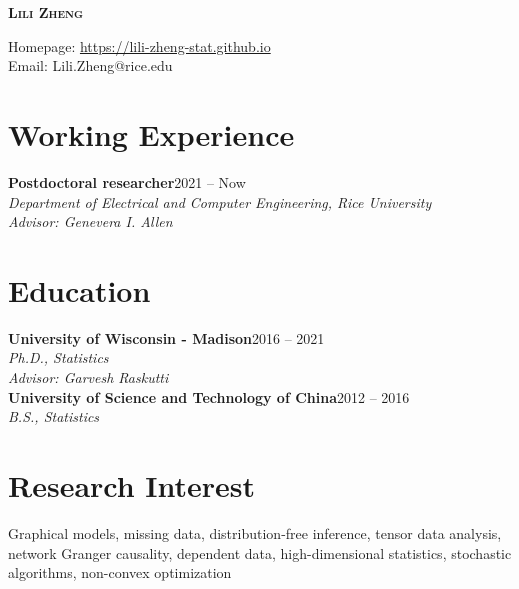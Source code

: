 \documentclass[letterpaper,11pt]{article}
\begin{document}
	
	
	\begin{center}
		\textbf{\Huge \scshape Lili Zheng} \\ \vspace{1pt}
		\begin{center}{\small Homepage: \href{https://Lili-Zheng-stat.github.io}{https://lili-zheng-stat.github.io}\\Email: Lili.Zheng@rice.edu}
	\end{center}
	\end{center}
	\section{Working Experience}
	 \textbf{Postdoctoral researcher}\hfill 2021 -- Now\\
	{\em \small Department of Electrical and Computer Engineering, Rice University}\\
	 {\em \small Advisor: Genevera I. Allen}
	\section{Education}
	\textbf{University of Wisconsin - Madison}\hfill {2016 -- 2021}\\
	{\em{\sl Ph.D.}, Statistics}\\
	{\em \small Advisor: Garvesh Raskutti}\\
	\textbf{University of Science and Technology of China}\hfill {2012 -- 2016}\\
	{\em \small{\sl B.S.}, Statistics}
	\section{Research Interest}
	Graphical models, missing data, distribution-free inference, tensor data analysis, network Granger causality, dependent data, high-dimensional statistics, stochastic algorithms, non-convex optimization
	
\end{document}
